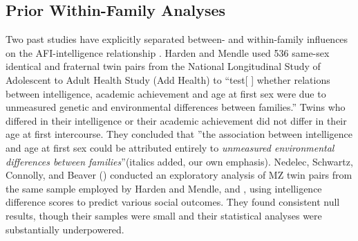 \subsection{Prior Within-Family Analyses} Two past studies have explicitly separated between- and within-family influences on the AFI-intelligence relationship \citep{harden2011don,nedelec2012exploring}. Harden and Mendle used 536 same-sex identical and fraternal twin pairs from the National Longitudinal Study of Adolescent to Adult Health Study (Add Health) to ``test[ ] whether relations between intelligence, academic achievement and age at first sex were due to unmeasured genetic and environmental differences between families.'' Twins who differed in their intelligence or their academic achievement did not differ in their age at first intercourse. They concluded that ''the association between intelligence and age at first sex could be attributed entirely to \textit{unmeasured environmental differences between families}''(italics added, our own emphasis). Nedelec, Schwartz, Connolly, and Beaver (\citeyear{nedelec2012exploring}) conducted an exploratory analysis of MZ twin pairs from the same sample employed by Harden and Mendle, and \citet{halpern2000smart}, using intelligence difference scores to predict various social outcomes. They found consistent null results, though their samples were small and their statistical analyses were substantially underpowered.
